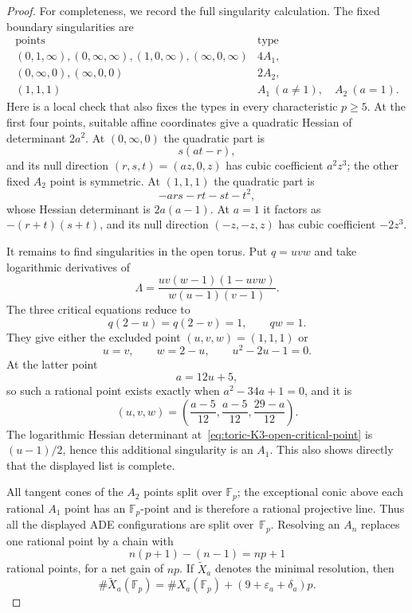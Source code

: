 \begin{proof}
For completeness, we record the full singularity calculation.  The fixed
boundary singularities are
\begin{equation}
\begin{array}{c|c}
\text{points}&\text{type}\\ \hline
 (0,1,\infty),(0,\infty,\infty),
 (1,0,\infty),(\infty,0,\infty)&4A_1,\\
 (0,\infty,0),(\infty,0,0)&2A_2,\\
 (1,1,1)&A_1\ (a\ne1),\quad A_2\ (a=1).
\end{array}
\label{eq:toric-K3-fixed-singularities}
\end{equation}
Here is a local check that also fixes the types in every characteristic
$p\geq5$.  At the first four points, suitable affine coordinates give a
quadratic Hessian of determinant $2a^2$.  At $(0,\infty,0)$ the quadratic
part is
\[
 s(at-r),
\]
and its null direction $(r,s,t)=(az,0,z)$ has cubic coefficient $a^2z^3$;
the other fixed $A_2$ point is symmetric.  At $(1,1,1)$ the quadratic part
is
\[
 -ars-rt-st-t^2,
\]
whose Hessian determinant is $2a(a-1)$.  At $a=1$ it factors as
$-(r+t)(s+t)$, and its null direction $(-z,-z,z)$ has cubic coefficient
$-2z^3$.

It remains to find singularities in the open torus.  Put $q=uvw$ and take
logarithmic derivatives of
\[
 \Lambda=\frac{uv(w-1)(1-uvw)}{w(u-1)(v-1)}.
\]
The three critical equations reduce to
\[
 q(2-u)=q(2-v)=1,
 \qquad qw=1.
\]
They give either the excluded point $(u,v,w)=(1,1,1)$ or
\begin{equation}
 u=v,\qquad w=2-u,\qquad u^2-2u-1=0.
 \label{eq:toric-K3-open-critical-point}
\end{equation}
At the latter point
\[
 a=12u+5,
\]
so such a rational point exists exactly when $a^2-34a+1=0$, and it is
\[
 (u,v,w)=\left(\frac{a-5}{12},\frac{a-5}{12},
                         \frac{29-a}{12}\right).
\]
The logarithmic Hessian determinant at~\eqref{eq:toric-K3-open-critical-point}
is $(u-1)/2$, hence this additional singularity is an $A_1$.  This also
shows directly that the displayed list is complete.

All tangent cones of the $A_2$ points split over $\mathbb F_p$; the
exceptional conic above each rational $A_1$ point has an
$\mathbb F_p$-point and is therefore a rational projective line.  Thus all
the displayed ADE configurations are split over~$\mathbb F_p$.  Resolving
an $A_n$ replaces one rational point by a chain with
\[
 n(p+1)-(n-1)=np+1
\]
rational points, for a net gain of $np$.  If $\widetilde X_a$ denotes the
minimal resolution, then
\begin{equation}
 \#\widetilde X_a(\mathbb F_p)
 =\#X_a(\mathbb F_p)+(9+\varepsilon_a+\delta_a)p.
 \label{eq:toric-K3-resolution-count}
\end{equation}


\end{proof}
